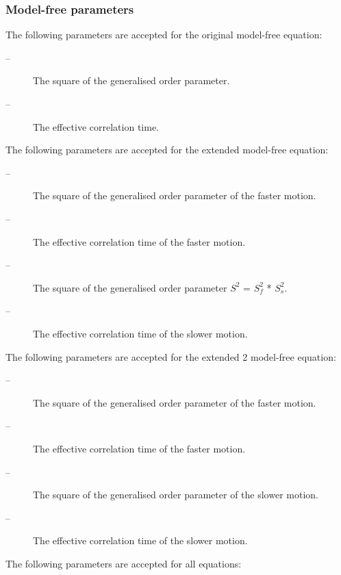 \subsubsection{Model-free parameters}

The following parameters are accepted for the original model-free equation:


\begin{description}
\item[ --]   The square of the generalised order parameter. 
\item[ --]   The effective correlation time. 
\end{description}


The following parameters are accepted for the extended model-free equation:


\begin{description}
\item[ --]  The square of the generalised order parameter of the faster motion. 
\item[ --]   The effective correlation time of the faster motion. 
\item[ --]   The square of the generalised order parameter $S^2$ = $S^2_f$ * $S^2_s$. 
\item[ --]   The effective correlation time of the slower motion. 
\end{description}


The following parameters are accepted for the extended 2 model-free equation:


\begin{description}
\item[ --]  The square of the generalised order parameter of the faster motion. 
\item[ --]   The effective correlation time of the faster motion. 
\item[ --]  The square of the generalised order parameter of the slower motion. 
\item[ --]   The effective correlation time of the slower motion. 
\end{description}


The following parameters are accepted for all equations:


